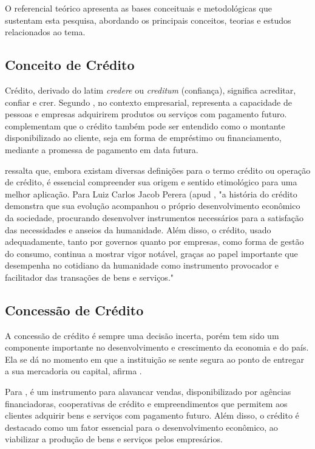 \documentclass[12pt,a4paper]{article}
\begin{document}
O referencial teórico apresenta as bases conceituais e metodológicas que sustentam esta pesquisa, abordando os principais conceitos, teorias e estudos relacionados ao tema.

\subsection{Conceito de Crédito}
Crédito, derivado do latim \textit{credere} ou \textit{creditum} (confiança), significa acreditar, confiar e crer. Segundo \cite{rossato2020}, no contexto empresarial, representa a capacidade de pessoas e empresas adquirirem produtos ou serviços com pagamento futuro. \cite{Cardoso2024} complementam que o crédito também pode ser entendido como o montante disponibilizado ao cliente, seja em forma de empréstimo ou financiamento, mediante a promessa de pagamento em data futura.

\cite{ALEXANDRE2003} ressalta que, embora existam diversas definições para o termo crédito ou operação de crédito, é essencial compreender sua origem e sentido etimológico para uma melhor aplicação. Para Luiz Carlos Jacob Perera (apud \cite{ALEXANDRE2003}, "a história do crédito demonstra que sua evolução acompanhou o próprio desenvolvimento econômico da sociedade, procurando desenvolver instrumentos necessários para a satisfação das necessidades e anseios da humanidade. Além disso, o crédito, usado adequadamente, tanto por governos quanto por empresas, como forma de gestão do consumo, continua a mostrar vigor notável, graças ao papel importante que desempenha no cotidiano da humanidade como instrumento provocador e facilitador das transações de bens e serviços."
\subsection{Concessão de Crédito}

A concessão de crédito é sempre uma decisão incerta, porém tem sido um componente importante no desenvolvimento e crescimento da economia e do país. Ela se dá no momento em que a instituição se sente segura ao ponto de entregar a sua mercadoria ou capital, afirma \cite{beserra2022}. 

Para \cite{rossato2020}, é um instrumento para alavancar vendas, disponibilizado por agências financiadoras, cooperativas de crédito e empreendimentos que permitem aos clientes adquirir bens e serviços com pagamento futuro. Além disso, o crédito é destacado como um fator essencial para o desenvolvimento econômico, ao viabilizar a produção de bens e serviços pelos empresários. 
\end{document}
